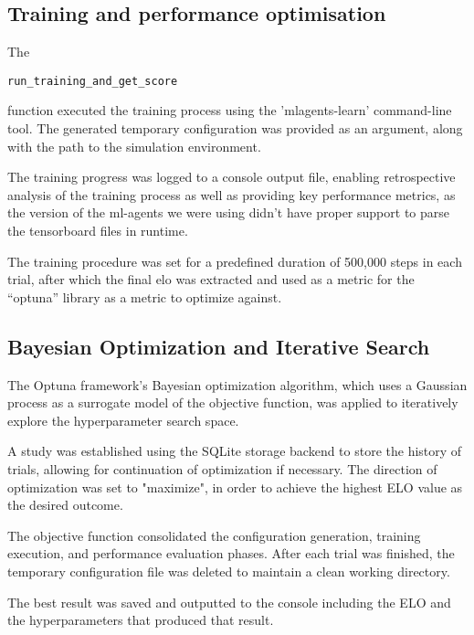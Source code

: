 \documentclass{LSkill}
\begin{document}
\subsection{Training and performance optimisation}

The \begin{verbatim}run_training_and_get_score\end{verbatim} function executed the training process using the 'mlagents-learn' command-line tool. The generated temporary configuration was provided as an argument, along with the path to the simulation environment.

The training progress was logged to a console output file, enabling retrospective analysis of the training process as well as providing key performance metrics, as the version of the ml-agents we were using didn’t have proper support to parse the tensorboard files in runtime.

The training procedure was set for a predefined duration of 500,000 steps in each trial, after which the final elo was extracted and used as a metric for the “optuna” library as a metric to optimize against.

\subsection{Bayesian Optimization and Iterative Search}

The Optuna framework's Bayesian optimization algorithm, which uses a Gaussian process as a surrogate model of the objective function, was applied to iteratively explore the hyperparameter search space.

A study was established using the SQLite storage backend to store the history of trials, allowing for continuation of optimization if necessary. The direction of optimization was set to "maximize", in order to achieve the highest ELO value as the desired outcome.

The objective function consolidated the configuration generation, training execution, and performance evaluation phases. After each trial was finished, the temporary configuration file was deleted to maintain a clean working directory.

The best result was saved and outputted to the console including the ELO and the hyperparameters that produced that result.
\end{document}
